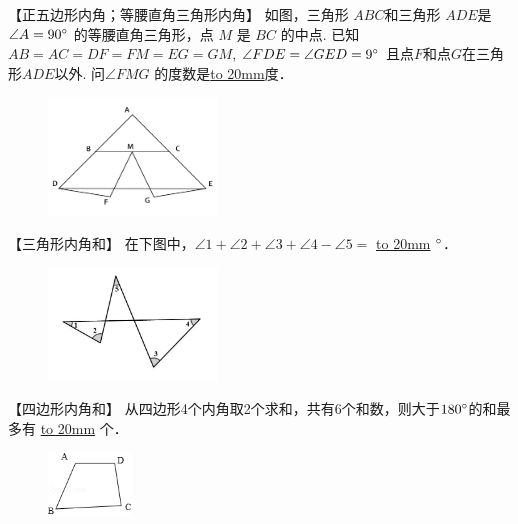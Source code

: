 \item {
    【正五边形内角；等腰直角三角形内角】
    如图，三角形 $ABC$和三角形 $ADE$是 $\angle A=90\degree$ 的等腰直角三角形，点 $M$ 是 $BC$ 的中点. 已知$AB=AC=DF=FM=EG=GM$, $\angle FDE = \angle GED=9\degree$ 且点$F$和点$G$在三角形$ADE$以外. 问$\angle FMG$ 的度数是\underline{\hbox to 20mm{}}度． 
    \begin{figure}[H] 
        \centering
        \includegraphics[width=0.4\textwidth]{./pics/Chapter_3/8.png}
    \end{figure}
    \vspace{1cm}
}

\item {
    【三角形内角和】
    {在下图中，$\angle 1 + \angle 2 + \angle 3 + \angle 4 - \angle 5=$ \underline{\hbox to 20mm{}} $\degree$．} 
    \begin{figure}[H] 
        \centering
        \includegraphics[width=0.4\textwidth]{./pics/Chapter_3/9.png}
    \end{figure}
    \vspace{1cm}
}

\item {
    【四边形内角和】
    从四边形4个内角取2个求和，共有6个和数，则大于$180\degree$的和最多有 \underline{\hbox to 20mm{}} 个．
    \begin{figure}[H] 
        \centering
        \includegraphics[width=0.2\textwidth]{./pics/Chapter_3/11.png}
    \end{figure}
    \vspace{1cm}
}
